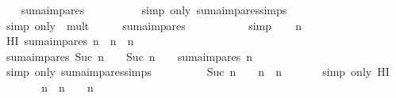 \begin{isabellebody}
\ \ \isamarkupfalse%
\ {\isachardoublequoteopen}suma{\isacharunderscore}impares\ {}\ {\isacharequal}\ {}{\isachardoublequoteclose}\ \isanewline
\ \ \ \ \isamarkupfalse%
\ {\isacharparenleft}simp\ only{\isacharcolon}\ suma{\isacharunderscore}impares{\isachardot}simps{\isacharparenleft}{}{\isacharparenright}{\isacharparenright}\isanewline
\ \ \isamarkupfalse%
\ \isamarkupfalse%
\ {\isachardoublequoteopen}{\isasymdots}\ {\isacharequal}\ {}\ {\isacharasterisk}\ {}{\isachardoublequoteclose}\isanewline
\ \ \ \ \isamarkupfalse%
\ {\isacharparenleft}simp\ only{\isacharcolon}\ \ mult{\isacharunderscore}{}{\isacharparenright}\isanewline
\ \ \isamarkupfalse%
\ \isamarkupfalse%
\ {\isachardoublequoteopen}suma{\isacharunderscore}impares\ {}\ {\isacharequal}\ {}\ {\isacharasterisk}\ {}{\isachardoublequoteclose}\isanewline
\ \ \ \ \isamarkupfalse%
\ simp\isanewline
{}\isamarkupfalse%
\isanewline
\ \ \isamarkupfalse%
\ n\ \isanewline
\ \ \isamarkupfalse%
\ HI{\isacharcolon}\ {\isachardoublequoteopen}suma{\isacharunderscore}impares\ n\ {\isacharequal}\ n\ {\isacharasterisk}\ n{\isachardoublequoteclose}\isanewline
\ \ \isamarkupfalse%
\ {\isachardoublequoteopen}suma{\isacharunderscore}impares\ {\isacharparenleft}Suc\ n{\isacharparenright}\ {\isacharequal}\ {\isacharparenleft}{}\ {\isacharasterisk}\ {\isacharparenleft}Suc\ n{\isacharparenright}\ {\isacharminus}\ {}{\isacharparenright}\ {\isacharplus}\ suma{\isacharunderscore}impares\ n{\isachardoublequoteclose}\ \isanewline
\ \ \ \ \isamarkupfalse%
\ {\isacharparenleft}simp\ only{\isacharcolon}\ suma{\isacharunderscore}impares{\isachardot}simps{\isacharparenleft}{}{\isacharparenright}{\isacharparenright}\isanewline
\ \ \isamarkupfalse%
\ \isamarkupfalse%
\ {\isachardoublequoteopen}{\isasymdots}\ {\isacharequal}\ {\isacharparenleft}{}\ {\isacharasterisk}\ {\isacharparenleft}Suc\ n{\isacharparenright}\ {\isacharminus}\ {}{\isacharparenright}\ {\isacharplus}\ n\ {\isacharasterisk}\ n{\isachardoublequoteclose}\ \isanewline
\ \ \ \ \isamarkupfalse%
\ {\isacharparenleft}simp\ only{\isacharcolon}\ HI{\isacharparenright}\isanewline
\ \ \isamarkupfalse%
\ \isamarkupfalse%
\ {\isachardoublequoteopen}{\isasymdots}\ {\isacharequal}\ n\ {\isacharasterisk}\ n\ {\isacharplus}\ {}\ {\isacharasterisk}\ n\ {\isacharplus}\ {}{\isachardoublequoteclose}\ \isanewline

\end{isabellebody}
